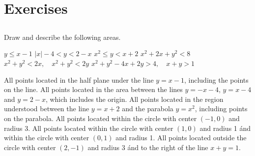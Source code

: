 \ifcourse %
\newpage
\section{Exercises}

\renewcommand{\ExerciseListName}{Opgave}

\subsection*{}


\begin{Exercise} Draw and describe the following areas. 
	\begin{multicols}{2}
        \Question[difficulty = 1] $y \leq x-1$ 
        \ifanalysis\Question[difficulty = 1]\fi\ifcalculus\Question[difficulty = 2]\fi $|x|-4 < y < 2-x$ 
        \Question[difficulty = 1] $x^2 \leq y < x+2$
	    \Question[difficulty = 1] $x^2+2x+y^2 <8$ 
	    \ifanalysis\Question[difficulty = 1]\fi\ifcalculus\Question[difficulty = 2]\fi $x^2+y^2 < 2x, \quad x^2+y^2 < 2y$ 
	    \Question[difficulty = 2] $x^2+y^2-4x+2y >4, \quad x+y>1$  
	    \EndCurrentQuestion
    \end{multicols}

\end{Exercise}
\begin{Answer}\phantom{}
    
	\Question All points located in the half plane under the line $y=x-1$, including the points on the line. 
	\Question All points located in the area between the lines $y=-x-4$, $y=x-4$ and $y=2-x$, which includes the origin. 
	\Question All points located in the region understood between the line $y=x+2$ and the parabola $y=x^2$, including points on the parabola. 
	\Question All points located within the circle with center $(-1,0)$ and radius 3.
	\Question All points located within the circle with center $(1,0)$ and radius 1 \' and within the circle with center $(0,1)$ and radius 1.
	\Question All points located outside the circle with center $(2,-1)$ and radius 3 \' and to the right of the line $x+y=1$.

\end{Answer}


	


